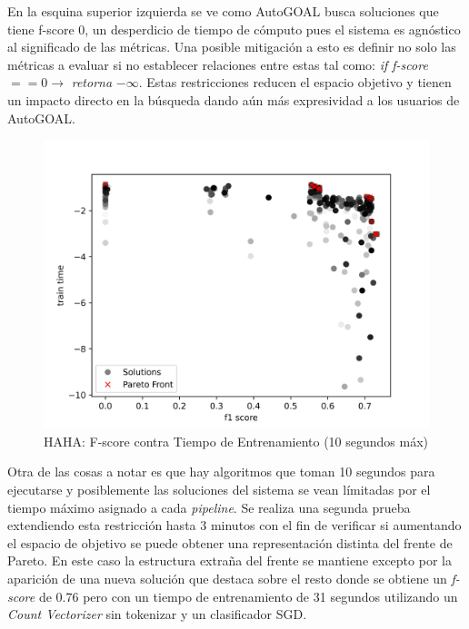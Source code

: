 En la esquina superior izquierda se ve como AutoGOAL busca soluciones que tiene f-score 0, un desperdicio de tiempo de c\'omputo pues el sistema es agn\'ostico al significado de las m\'etricas. Una posible mitigaci\'on a esto es definir no solo las m\'etricas a evaluar si no establecer relaciones entre estas tal como: \textit{if f-score} $== 0 \rightarrow $ \textit{retorna} $-\infty$. Estas restricciones reducen el espacio objetivo y tienen un impacto directo en la b\'usqueda dando a\'un m\'as expresividad a los usuarios de AutoGOAL.

\begin{figure}[ht]
    \centering
    \includegraphics[scale=0.65]{Pictures/haha_fscore_vs_time.jpg}
    \caption{HAHA: F-score contra Tiempo de Entrenamiento (10 segundos m\'ax)}
    \label{impl:fig:haha:fscore_vs_time}
\end{figure}

Otra de las cosas a notar es que hay algoritmos que toman 10 segundos para ejecutarse y posiblemente las soluciones del sistema se vean l\'imitadas por el tiempo m\'aximo asignado a cada \textit{pipeline}. Se realiza una segunda prueba extendiendo esta restricci\'on hasta 3 minutos con el fin de verificar si aumentando el espacio de objetivo se puede obtener una representaci\'on distinta del frente de Pareto. En este caso la estructura extra\~na del frente se mantiene excepto por la aparici\'on de una nueva soluci\'on que destaca sobre el resto donde se obtiene un \textit{f-score} de 0.76 pero con un tiempo de entrenamiento de 31 segundos utilizando un \textit{Count Vectorizer} sin tokenizar y un  clasificador SGD.

